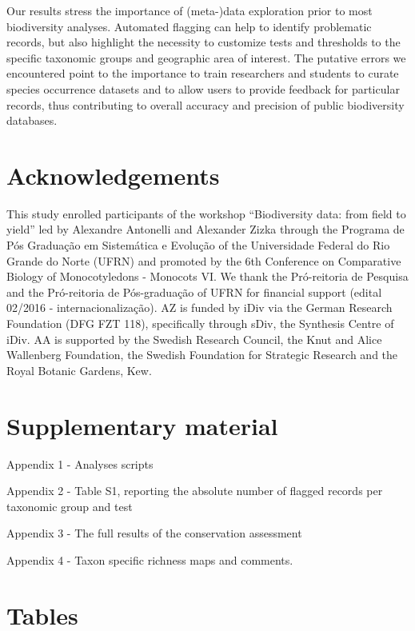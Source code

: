\documentclass[
  12pt,
]{article}
\begin{document}
Our results stress the importance of (meta-)data exploration prior to most biodiversity analyses. Automated flagging can help to identify problematic records, but also highlight the necessity to customize tests and thresholds to the specific taxonomic groups and geographic area of interest. The putative errors we encountered point to the importance to train researchers and students to curate species occurrence datasets and to allow users to provide feedback for particular records, thus contributing to overall accuracy and precision of public biodiversity databases.

\hypertarget{acknowledgements}{%
\section{Acknowledgements}\label{acknowledgements}}

This study enrolled participants of the workshop ``Biodiversity data: from field to yield'' led by Alexandre Antonelli and Alexander Zizka through the Programa de Pós Graduação em Sistemática e Evolução of the Universidade Federal do Rio Grande do Norte (UFRN) and promoted by the 6th Conference on Comparative Biology of Monocotyledons - Monocots VI. We thank the Pró-reitoria de Pesquisa and the Pró-reitoria de Pós-graduação of UFRN for financial support (edital 02/2016 - internacionalização). AZ is funded by iDiv via the German Research Foundation (DFG FZT 118), specifically through sDiv, the Synthesis Centre of iDiv. AA is supported by the Swedish Research Council, the Knut and Alice Wallenberg Foundation, the Swedish Foundation for Strategic Research and the Royal Botanic Gardens, Kew.

\hypertarget{supplementary-material}{%
\section{Supplementary material}\label{supplementary-material}}

Appendix 1 - Analyses scripts

Appendix 2 - Table S1, reporting the absolute number of flagged records per taxonomic group and test

Appendix 3 - The full results of the conservation assessment

Appendix 4 - Taxon specific richness maps and comments.

\newpage{}

\hypertarget{tables}{%
\section{Tables}\label{tables}}
\end{document}
